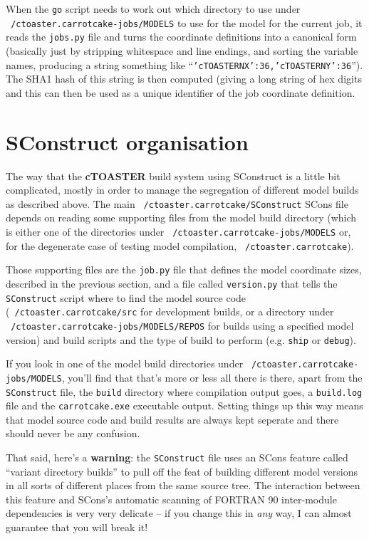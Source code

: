 \documentclass[a4paper,10pt,article]{memoir}
\begin{document}
When the \texttt{go} script needs to work out which directory to use
under 
\\\texttt{~/ctoaster.carrotcake-jobs/MODELS} to use for the model for the
current job, it reads the \texttt{jobs.py} file and turns the
coordinate definitions into a canonical form (basically just by
stripping whitespace and line endings, and sorting the variable names,
producing a string something like
``\texttt{'cTOASTERNX':36,'cTOASTERNY':36}'').  The SHA1 hash of this string
is then computed (giving a long string of hex digits and this can then
be used as a unique identifier of the job coordinate definition.

\section{SConstruct organisation}

The way that the \textbf{cTOASTER} build system using SConstruct is a little bit
complicated, mostly in order to manage the segregation of different
model builds as described above.  The main
\texttt{~/ctoaster.carrotcake/SConstruct} SCons file depends on reading some
supporting files from the model build directory (which is either one
of the directories under \texttt{~/ctoaster.carrotcake-jobs/MODELS} or, for the
degenerate case of testing model compilation, \texttt{~/ctoaster.carrotcake}).

Those supporting files are the \texttt{job.py} file that defines the
model coordinate sizes, described in the previous section, and a file
called \texttt{version.py} that tells the \texttt{SConstruct} script
where to find the model source code (\texttt{~/ctoaster.carrotcake/src} for
development builds, or a directory under
\\\texttt{~/ctoaster.carrotcake-jobs/MODELS/REPOS} for builds using a specified model
version) and build scripts and the type of build to perform
(e.g. \texttt{ship} or \texttt{debug}).

If you look in one of the model build directories under
\texttt{~/ctoaster.carrotcake-jobs/MODELS}, you'll find that that's more or less
all there is there, apart from the \texttt{SConstruct} file, the
\texttt{build} directory where compilation output goes, a
\texttt{build.log} file and the \texttt{carrotcake.exe} executable output.
Setting things up this way means that model source code and build
results are always kept seperate and there should never be any
confusion.

That said, here's a \textbf{warning}: the \texttt{SConstruct} file
uses an SCons feature called ``variant directory builds'' to pull off
the feat of building different model versions in all sorts of
different places from the same source tree.  The interaction between
this feature and SCons's automatic scanning of FORTRAN 90 inter-module
dependencies is very very delicate -- if you change this in \emph{any}
way, I can almost guarantee that you will break it!
\end{document}
